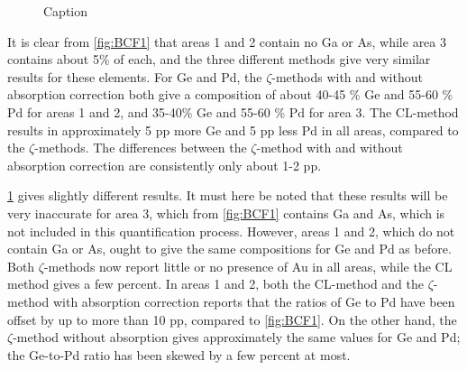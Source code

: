 \begin{figure}[h!]
\begin{subfigure}{0.7\textwidth}
		\caption{}
		\label{fig:BCF2}
	\end{subfigure}
	\caption{
		\label{fig:}%
		Caption}
\end{figure}

It is clear from \cref{fig:BCF1} that areas 1 and 2 contain no Ga or As, while area 3 contains about 5\% of each, and the three different methods give very similar results for these elements. For Ge and Pd, the $\zeta$-methods with and without absorption correction both give a composition of about 40-45 \% Ge and 55-60 \% Pd for areas 1 and 2, and 35-40\% Ge and 55-60 \% Pd for area 3. The CL-method results in approximately 5 pp more Ge and 5 pp less Pd in all areas, compared to the $\zeta$-methods. The differences between the $\zeta$-method with and without absorption correction are consistently only about 1-2 pp.

\cref{fig:BCF2} gives slightly different results. It must here be noted that these results will be very inaccurate for area 3, which from \cref{fig:BCF1} contains Ga and As, which is not included in this quantification process. However, areas 1 and 2, which do not contain Ga or As, ought to give the same compositions for Ge and Pd as before. Both $\zeta$-methods now report little or no presence of Au in all areas, while the CL method gives a few percent. In areas 1 and 2, both the CL-method and the $\zeta$-method with absorption correction reports that the ratios of Ge to Pd have been offset by up to more than 10 pp, compared to \cref{fig:BCF1}. On the other hand, the $\zeta$-method without absorption gives approximately the same values for Ge and Pd; the Ge-to-Pd ratio has been skewed by a few percent at most. 


